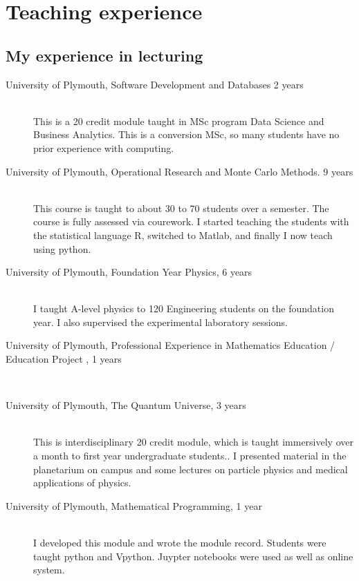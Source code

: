 \documentclass[12pt]{article}
\begin{document}
\FloatBarrier

%
\section{Teaching experience}

\subsection{My experience in lecturing}


\begin{description}

 \item[University of Plymouth, 
Software Development and Databases
2 years]\hfill \\ This is a 20 credit module taught in
MSc program Data Science and Business Analytics. This is a conversion
MSc, so many students have no prior experience with computing.

  \item[University of Plymouth, Operational Research and Monte Carlo Methods.
9 years] \hfill \\
This course is taught to about 30 to 70 students over a semester. The course is fully
assessed via courework. I started teaching the students with the statistical language R, switched 
to Matlab, and finally I now teach using python.

  \item[University of Plymouth, Foundation Year Physics,
6 years] \hfill \\
I taught A-level physics to 120 Engineering students
on the foundation year. I also supervised the experimental 
laboratory sessions.

\item[University of Plymouth, Professional Experience in Mathematics
  Education / Education Project ,
1 years] \hfill \\

  \item[University of Plymouth, The Quantum Universe,
3 years] \hfill \\
This is interdisciplinary 20 credit module, which is taught
immersively over a month to first year undergraduate students.. 
I presented material in the planetarium on campus and some lectures on
particle physics and medical applications of physics.

  \item[University of Plymouth, Mathematical Programming,
1 year] \hfill \\
I developed this module and wrote the module record. Students
were taught python and Vpython. Juypter notebooks were used as well
as online system.


\end{description}
\end{document}
